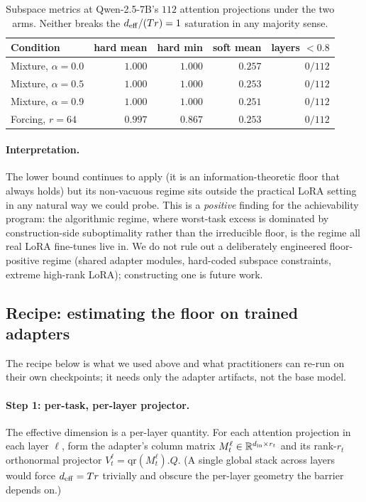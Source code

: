 \begin{table}[t]
\centering
\caption{Subspace metrics at Qwen-2.5-7B's $112$ attention projections
under the two arms. Neither breaks the $d_{\mathrm{eff}}/(Tr) = 1$ saturation in
any majority sense.}
\label{tab:e5-null}
\begin{tabular}{lrrrr}
\hline
Condition & hard mean & hard min & soft mean & layers $< 0.8$ \\
\hline
Mixture, $\alpha = 0.0$  & $1.000$ & $1.000$ & $0.257$ & $0/112$ \\
Mixture, $\alpha = 0.5$  & $1.000$ & $1.000$ & $0.253$ & $0/112$ \\
Mixture, $\alpha = 0.9$  & $1.000$ & $1.000$ & $0.251$ & $0/112$ \\
Forcing, $r = 64$        & $0.997$ & $0.867$ & $0.253$ & $0/112$ \\
\hline
\end{tabular}
\end{table}

\paragraph{Interpretation.} The lower bound continues to apply (it
is an information-theoretic floor that always holds) but its
non-vacuous regime sits outside the practical LoRA setting in any
natural way we could probe. This is a \emph{positive} finding for the
achievability program: the algorithmic regime, where worst-task excess
is dominated by construction-side suboptimality rather than the
irreducible floor, is the regime all real LoRA fine-tunes live in. We
do not rule out a deliberately engineered floor-positive regime (shared
adapter modules, hard-coded subspace constraints, extreme high-rank
LoRA); constructing one is future work.

\subsection{Recipe: estimating the floor on trained adapters}
\label{subsec:floor-recipe}

The recipe below is what we used above and what practitioners can
re-run on their own checkpoints; it needs only the adapter artifacts,
not the base model.

\paragraph{Step 1: per-task, per-layer projector.} The effective
dimension is a per-layer quantity. For each attention
projection in each layer $\ell$, form the adapter's column matrix
$M_t^\ell \in \mathbb{R}^{d_{\mathrm{in}} \times r_t}$ and its rank-$r_t$
orthonormal projector $V_t^\ell = \mathrm{qr}(M_t^\ell).Q$. (A single
global stack across layers would force $d_{\mathrm{eff}} = Tr$ trivially and
obscure the per-layer geometry the barrier depends on.)

